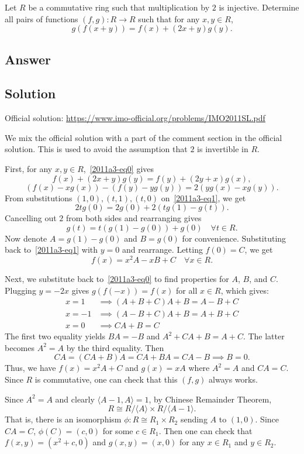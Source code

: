 Let $R$ be a commutative ring such that multiplication by $2$ is injective.
Determine all pairs of functions $(f, g) : R \to R$ such that for any $x, y \in R$,
\[ g(f(x + y)) = f(x) + (2x + y) g(y). \tag{*}\label{2011a3-eq0} \]



\subsection*{Answer}





\subsection*{Solution}

Official solution: \url{https://www.imo-official.org/problems/IMO2011SL.pdf}

We mix the official solution with a part of the comment section in the official solution.
This is used to avoid the assumption that $2$ is invertible in $R$.

First, for any $x, y \in R$,~\eqref{2011a3-eq0} gives
\[ f(x) + (2x + y) g(y) = f(y) + (2y + x) g(x), \]
\[ (f(x) - x g(x)) - (f(y) - y g(y)) = 2 (y g(x) - x g(y)). \tag{1}\label{2011a3-eq1} \]
From substitutions $(1, 0), (t, 1), (t, 0)$ on~\eqref{2011a3-eq1}, we get
\[ 2 t g(0) = 2 g(0) + 2 (t g(1) - g(t)). \]
Cancelling out $2$ from both sides and rearranging gives
\[ g(t) = t (g(1) - g(0)) + g(0) \quad \forall t \in R. \tag{2}\label{2011a3-eq2} \]
Now denote $A = g(1) - g(0)$ and $B = g(0)$ for convenience.
Substituting back to~\eqref{2011a3-eq1} with $y = 0$ and rearrange.
Letting $f(0) = C$, we get
\[ f(x) = x^2 A - xB + C \quad \forall x \in R. \tag{3}\label{2011a3-eq3} \]

Next, we substitute back to~\eqref{2011a3-eq0} to find properties for $A$, $B$, and $C$.
Plugging $y = -2x$ gives $g(f(-x)) = f(x)$ for all $x \in R$, which gives:
\begin{align*}
    x = 1 &\implies (A + B + C)A + B = A - B + C \\
    x = -1 &\implies (A - B + C)A + B = A + B + C \\
    x = 0 &\implies CA + B = C
\end{align*}
The first two equality yields $BA = -B$ and $A^2 + CA + B = A + C$.
The latter becomes $A^2 = A$ by the third equality.
Then \[ CA = (CA + B)A = CA + BA = CA - B \implies B = 0. \]
Thus, we have $f(x) = x^2 A + C$ and $g(x) = xA$ where $A^2 = A$ and $CA = C$.
Since $R$ is commutative, one can check that this $(f, g)$ always works.

Since $A^2 = A$ and clearly $\langle A - 1, A \rangle = 1$, by Chinese Remainder Theorem,
\[ R \cong R/\langle A \rangle \times R/\langle A - 1 \rangle. \]
That is, there is an isomorphism $\phi : R \cong R_1 \times R_2$ sending $A$ to $(1, 0)$.
Since $CA = C$, $\phi(C) = (c, 0)$ for some $c \in R_1$.
Then one can check that $f(x, y) = (x^2 + c, 0)$ and $g(x, y) = (x, 0)$ for any $x \in R_1$ and $y \in R_2$.
